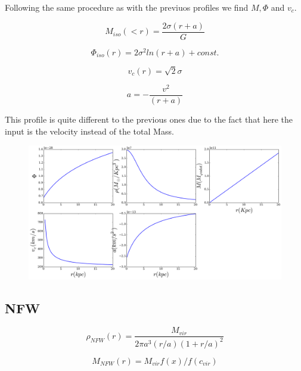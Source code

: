 Following the same procedure as with the previuos profiles we find $M, \Phi$  and $v_c$.

\begin{equation}
M_{iso}(<r) = \dfrac{2 \sigma (r+a)}{G}
\end{equation}

\begin{equation}
\Phi_{iso}(r) = 2 \sigma^2 ln(r+a)  + const.
\end{equation}

\begin{equation}\label{eq:SISv}
v_c(r) = \sqrt{2}\sigma
\end{equation}

\begin{equation}
a = - \dfrac{v^2}{(r+a)}
\end{equation}

This profile is quite different to the previous ones due to the fact that here the input is
the velocity instead of the total Mass.

\begin{figure}[H]
\centering
\includegraphics[scale=0.35]{../figures/sis.png}
\end{figure}




\subsection{NFW}


\begin{equation}\label{eq:rhoNFW}
\rho_{NFW}(r) = \dfrac{M_{vir}}{2\pi a^3(r/a) (1 + r/a)^2}
\end{equation}


\begin{equation}\label{eq:MNFW}
M_{NFW}(r) =  M_{vir}  f(x) / f(c_{vir})
\end{equation}

